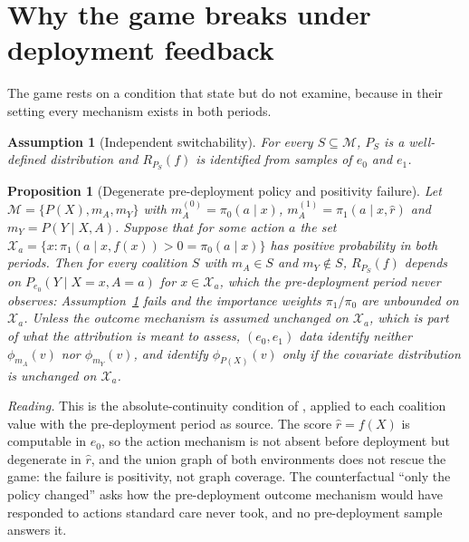\documentclass[letterpaper]{article} %
\newtheorem{proposition}{Proposition}
\newtheorem{assumption}{Assumption}
\newcommand{\rhat}{\hat r}
\begin{document}
\section{Why the game breaks under deployment feedback}
\label{sec:break}

The game rests on a condition that \citet{zhang2023attributing} state but do
not examine, because in their setting every mechanism exists in both periods.

\begin{assumption}[Independent switchability]
\label{ass:switch}
For every $S \subseteq \mathcal{M}$, $P_S$ is a well-defined distribution and
$R_{P_S}(f)$ is identified from samples of $e_0$ and $e_1$.
\end{assumption}

\begin{proposition}[Degenerate pre-deployment policy and positivity failure]
\label{prop:absence}
Let $\mathcal{M} = \{P(X), m_A, m_Y\}$ with $m_A^{(0)} = \pi_0(a \mid x)$,
$m_A^{(1)} = \pi_1(a \mid x, \rhat)$ and $m_Y = P(Y \mid X, A)$. Suppose that
for some action $a$ the set
$\mathcal{X}_a = \{x : \pi_1(a \mid x, f(x)) > 0 = \pi_0(a \mid x)\}$ has
positive probability in both periods. Then for every coalition $S$ with
$m_A \in S$ and $m_Y \notin S$, $R_{P_S}(f)$ depends on
$P_{e_0}(Y \mid X = x, A = a)$ for $x \in \mathcal{X}_a$, which the
pre-deployment period never observes: Assumption~\ref{ass:switch} fails and
the importance weights $\pi_1 / \pi_0$ are unbounded on $\mathcal{X}_a$.
Unless the outcome mechanism is assumed unchanged on $\mathcal{X}_a$, which
is part of what the attribution is meant to assess, $(e_0, e_1)$ data
identify neither $\phi_{m_A}(v)$ nor $\phi_{m_Y}(v)$, and identify
$\phi_{P(X)}(v)$ only if the covariate distribution is unchanged on
$\mathcal{X}_a$.
\end{proposition}

\noindent\emph{Reading.} This is the absolute-continuity condition of
\citet{boeken2024evaluating}, applied to each coalition value with the
pre-deployment period as source. The score $\rhat = f(X)$ is computable in
$e_0$, so the action mechanism is not absent before deployment but degenerate
in $\rhat$, and the union graph of both environments does not rescue the game:
the failure is positivity, not graph coverage. The counterfactual ``only the
policy changed'' asks how the pre-deployment outcome mechanism would have
responded to actions standard care never took, and no pre-deployment sample
answers it.
\end{document}
